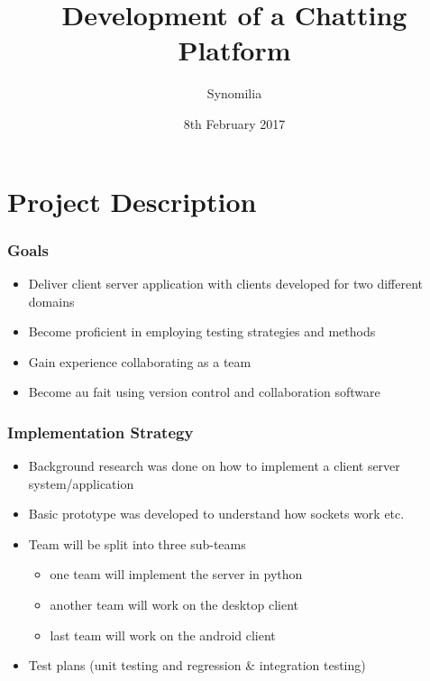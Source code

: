 \documentclass[11pt,compress,xcolor={usenames,dvipsnames}]{beamer}
\title[Chatting Plattform]{Development of a Chatting Platform}
\author[Synomilia]{Synomilia}
\date[08-02-2017]{8th February 2017}
\institute[]{King's College London}
\begin{document}
\begin{frame} 
\maketitle 
\end{frame}


\section{Project Description}
\begin{frame}
\frametitle{Goals}
\begin{itemize}
\item Deliver client server application with clients developed for two different domains
\item Become proficient in employing testing strategies and methods
\item Gain experience collaborating as a team
\item Become au fait using version control and collaboration software
\end{itemize}
\end{frame}

\begin{frame}
\frametitle{Implementation Strategy}
\begin{itemize}
\item Background research was done on how to implement a client server system/application
\item Basic prototype was developed to understand how sockets work etc.



\item Team will be split into three sub-teams 
\begin{itemize}
\item one team will implement the server in python 
\item another team will work on the desktop client 
\item last team will work on the android client 
\end{itemize}
\item Test plans (unit testing and regression \& integration testing)
\end{itemize}
\end{frame}
\end{document}
